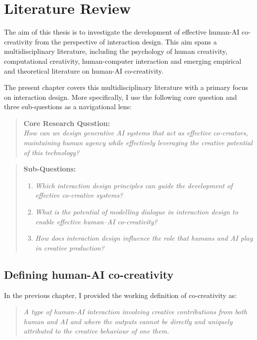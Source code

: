 \chapter{Literature Review}

The aim of this thesis is to investigate the development of effective human-AI co-creativity from the perspective of interaction design. This aim spans a multidisciplinary literature, including the psychology of human creativity, computational creativity, human-computer interaction and emerging empirical and theoretical literature on human-AI co-creativity. 

The present chapter covers this multidisciplinary literature with a primary focus on interaction design. More specifically, I use the following core question and three sub-questions as a navigational lens:

\begin{quote}
\textbf{Core Research Question:}\\
\emph{How can we design generative AI systems that act as effective co-creators, maintaining human agency while effectively leveraging the creative potential of this technology?}
\end{quote}

\begin{quote}
\textbf{Sub-Questions:}
\begin{enumerate}
    \item \emph{Which interaction design principles can guide the development of effective co-creative systems?}
    \item \emph{What is the potential of modelling dialogue in interaction design to enable effective human--AI co-creativity?}
    \item \emph{How does interaction design influence the role that humans and AI play in creative production?}
\end{enumerate}
\end{quote}


\section{Defining human-AI co-creativity}

In the previous chapter, I provided the working definition of co-creativity as:

\begin{quote}
\emph{A type of human-AI interaction involving creative contributions from both human and AI and where the outputs cannot be directly and uniquely attributed to the creative behaviour of one them.}
\end{quote}

